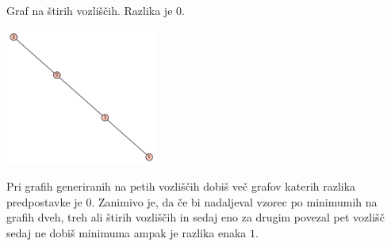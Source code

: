 \documentclass[10pt, a4paper]{article}
\begin{document}
Graf na štirih vozliščih. Razlika je $0$.

\includegraphics[width=5cm]{min_graf_4_vozlisca}

Pri grafih generiranih na petih vozliščih dobiš več grafov katerih razlika predpostavke je $0$. Zanimivo je, da če bi nadaljeval vzorec po minimumih na grafih dveh, treh ali štirih vozliščih  in sedaj eno za drugim povezal pet vozlišč sedaj ne dobiš minimuma ampak je razlika enaka $1$. 
\end{document}
